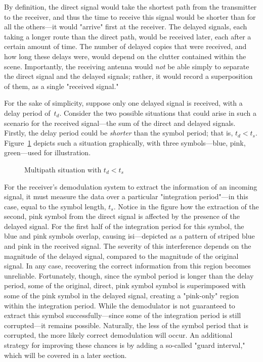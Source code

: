 \documentclass[class=report,11pt,crop=false]{standalone}
\begin{document}
By definition, the direct signal would take the shortest path from the transmitter to the receiver, and thus the time to receive this signal would be shorter than for all the others---it would "arrive" first at the receiver. The delayed signals, each taking a longer route than the direct path, would be received later, each after a certain amount of time. The number of delayed copies that were received, and how long these delays were, would depend on the clutter contained within the scene. Importantly, the receiving antenna would \emph{not} be able simply to separate the direct signal and the delayed signals; rather, it would record a superposition of them, as a single "received signal."

For the sake of simplicity, suppose only one delayed signal is received, with a delay period of~\(t_d\). Consider the two possible situations that could arise in such a scenario for the received signal---the sum of the direct and delayed signals. Firstly, the delay period could be \emph{shorter} than the symbol period; that is, \(t_d < t_s\). Figure~\ref{fig:multipath-symbol-lessthan} depicts such a situation graphically, with three symbols---blue, pink, green---used for illustration.

\begin{figure}[htbp]
    \centering
    \captionsetup{type=figure}
    \def\svgwidth{0.8\linewidth}
    { %
        }
    \caption{Multipath situation with \(t_d < t_s\)}
    \label{fig:multipath-symbol-lessthan}
\end{figure}

For the receiver's demodulation system to extract the information of an incoming signal, it must measure the data over a particular "integration period"---in this case, equal to the symbol length, \(t_s\). Notice in the figure how the extraction of the second, pink symbol from the direct signal is affected by the presence of the delayed signal. For the first half of the integration period for this symbol, the blue and pink symbols overlap, causing \gls{isi}---depicted as a pattern of striped blue and pink in the received signal. The severity of this interference depends on the magnitude of the delayed signal, compared to the magnitude of the original signal. In any case, recovering the correct information from this region becomes unreliable. Fortunately, though, since the symbol period is longer than the delay period, some of the original, direct, pink symbol symbol is superimposed with some of the pink symbol in the delayed signal, creating a "pink-only" region within the integration period. While the demodulator is not guaranteed to extract this symbol successfully---since some of the integration period is still corrupted---it remains possible. Naturally, the less of the symbol period that is corrupted, the more likely correct demodulation will occur. An additional strategy for improving these chances is by adding a so-called "guard interval," which will be covered in a later section.
\end{document}
